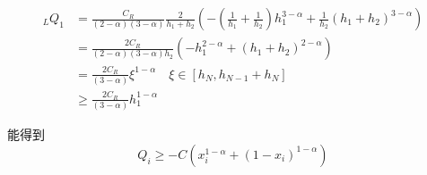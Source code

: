 \documentclass{ctexart}
\begin{document}
\begin{equation}
    \begin{aligned}
        {_L}Q_1 &= \frac{C_R}{(2-\alpha)(3-\alpha)} \frac{2}{h_{1} + h_{2}}
        \left( - (\frac{1}{h_{1}}+\frac{1}{h_{2}}) h_{1}^{3-\alpha}
        +  \frac{1}{h_{2}} (h_{1}+h_{2})^{3-\alpha} \right) \\
        & = \frac{2 C_R}{(2-\alpha)(3-\alpha) h_{2}}
        \left( - h_{1}^{2-\alpha}
        +  (h_{1}+h_{2})^{2-\alpha} \right) \\
        & = \frac{2 C_R}{(3-\alpha)} \xi^{1-\alpha}    \quad \xi \in [h_N, h_{N-1}+h_{N}]     \\
        & \ge \frac{2 C_R}{(3-\alpha)} h_1^{1-\alpha}
    \end{aligned}
\end{equation}

能得到
\begin{equation}
    Q_i \ge -C (x_i^{1-\alpha} + (1-x_i)^{1-\alpha})
\end{equation}
\end{document}
